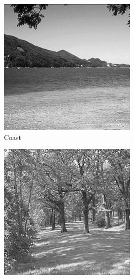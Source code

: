 \documentclass{report}
\begin{document}
\begin{figure}[H]
        \centering
        \begin{subfigure}[b]{0.17\textwidth}
                \begin{subfigure}[H]{\textwidth}
                	\includegraphics[width=\textwidth]{graphics/coast.png}
                	\caption{Coast}
        		\end{subfigure}
        		\begin{subfigure}[b]{\textwidth}
        			\includegraphics[width=\textwidth]{graphics/forest.png}

\end{subfigure}
\end{subfigure}
\end{figure}
\end{document}
